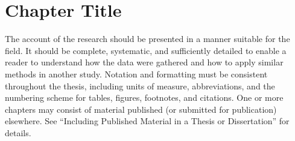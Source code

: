 \chapter{Chapter Title}
\label{chapter_1_chtitle}

The account of the research should be presented in a manner suitable for the field. It should be complete, systematic, and sufficiently detailed to enable a reader to understand how the data were gathered and how to apply similar methods in another study. Notation and formatting must be consistent throughout the thesis, including units of measure, abbreviations, and the numbering scheme for tables, figures, footnotes, and citations. One or more chapters may consist of material published (or submitted for publication) elsewhere. See “Including Published Material in a Thesis or Dissertation” for details.